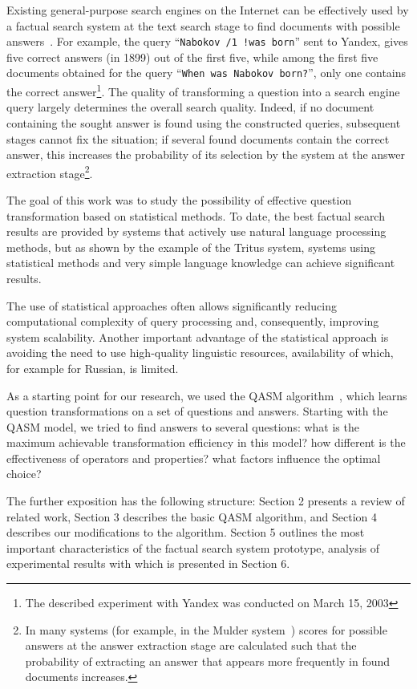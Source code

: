 \documentclass{article}
\newcommand{\query}[1]{``{\textrm{\tt #1}}''}
\begin{document}
Existing general-purpose search engines on the Internet can be
effectively used by a factual search system
at the text search stage to find
documents with possible answers~\cite{qa:radev:getting_answers}.
For example,
the query \query{Nabokov /1 !was born} sent to Yandex,
gives five correct answers (in 1899) out of the first five,
while among the first five documents obtained for the query \query{When was Nabokov born?},
only one contains the correct
answer\footnote{The described experiment with Yandex was conducted on March 15,
2003}.
The quality of transforming a question into a search engine query
largely determines the overall search quality.
Indeed, if no document
containing the sought answer is found using the constructed queries,
subsequent stages cannot fix the situation;
if several found documents contain the correct answer,
this increases the probability of its selection by the system at the answer extraction stage\footnote{
In many systems (for example, in the Mulder system~\cite{qa:Mulder})
scores for possible answers at the answer extraction stage
are calculated such that the probability
of extracting an answer that appears more frequently in found documents increases.
}.

The goal of this work was to study the possibility of effective
question transformation based on statistical methods.
To date, the best factual search results are provided by
systems that actively use natural language processing methods,
but as shown by the example of the Tritus system\cite{qa:Tritus}, systems using
statistical methods and very simple language knowledge
can achieve significant results.

The use of statistical approaches often allows
significantly reducing computational
complexity of query processing and, consequently, improving system scalability.
Another important advantage of the statistical approach is avoiding
the need to use high-quality linguistic resources,
availability of which, for example for Russian, is limited.

As a starting point for our research, we used the
QASM algorithm~\cite{qa:radev:qasm}, which
learns question transformations on a set of questions and answers.
Starting with the QASM model, we tried to find answers to several questions:
what is the maximum achievable transformation efficiency in this
model? how different is the effectiveness of operators and properties?
what factors influence the optimal choice?

The further exposition has the following structure:
Section 2 presents a review of related work,
Section 3 describes the basic QASM algorithm,
and Section 4 describes our modifications to the algorithm.
Section 5 outlines the most important characteristics of
the factual search system prototype,
analysis of experimental results with which is presented in Section 6.
\end{document}
